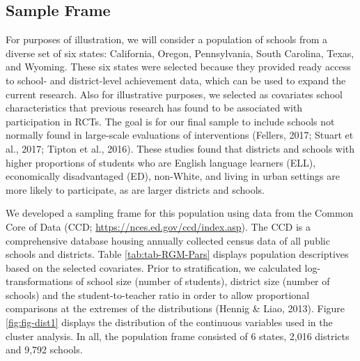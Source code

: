 \documentclass[
  english,
  man,floatsintext]{apa6}
\begin{document}
\hypertarget{sample-frame}{%
\subsection{Sample Frame}\label{sample-frame}}

For purposes of illustration, we will consider a population of schools from a diverse set of six states: California, Oregon, Pennsylvania, South Carolina, Texas, and Wyoming. These six states were selected because they provided ready access to school- and district-level achievement data, which can be used to expand the current research. Also for illustrative purposes, we selected as covariates school characteristics that previous research has found to be associated with participation in RCTs. The goal is for our final sample to include schools not normally found in large-scale evaluations of interventions (Fellers, 2017; Stuart et al., 2017; Tipton et al., 2016). These studies found that districts and schools with higher proportions of students who are English language learners (ELL), economically disadvantaged (ED), non-White, and living in urban settings are more likely to participate, as are larger districts and schools.

We developed a sampling frame for this population using data from the Common Core of Data (CCD; \url{https://nces.ed.gov/ccd/index.asp}). The CCD is a comprehensive database housing annually collected census data of all public schools and districts. Table \ref{tab:tab-RGM-Pars} displays population descriptives based on the selected covariates. Prior to stratification, we calculated log-transformations of school size (number of students), district size (number of schools) and the student-to-teacher ratio in order to allow proportional comparisons at the extremes of the distributions (Hennig \& Liao, 2013). Figure \ref{fig:fig-dist1} displays the distribution of the continuous variables used in the cluster analysis. In all, the population frame consisted of 6 states, 2,016 districts and 9,792 schools.
\end{document}
